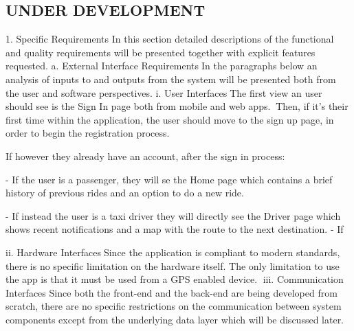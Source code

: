 	\subsection{UNDER DEVELOPMENT}

	1. Specific Requirements In this section detailed descriptions of the functional and quality requirements will be presented together with explicit features requested.
		a. External Interface RequirementsIn the paragraphs below an analysis of inputs to and outputs from the system will be presented both from the user and software perspectives.
			i. User InterfacesThe first view an user should see is the Sign In page both from mobile and web apps.Then, if it's their first time within the application, the user should move to the sign up page, in order to begin the registration process.
			
			If however they already have an account, after the sign in process:
			
			- If the user is a passenger, they will se the Home page which contains a brief history of previous rides and an option to do a new ride.
			
			- If instead the user is a taxi driver they will directly see the Driver page which shows recent notifications and a map with the route to the next destination.
			- If 
			
			ii. Hardware InterfacesSince the application is compliant to modern standards, there is no specific limitation on the hardware itself. The only limitation to use the app is that it must be used from a GPS enabled device.
			iii. Communication Interfaces
			Since both the front-end and the back-end are being developed from scratch, there are no specific restrictions on the communication between system components except from the underlying data layer which will be discussed later.

